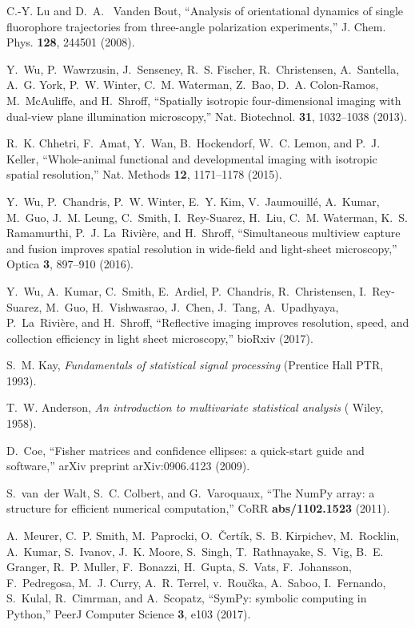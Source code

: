 \documentclass[10pt]{article}
\begin{document}
\begin{thebibliography}{10}
C.-Y. Lu and D.~A.~\hypertarget{vanden}{{\color{urlblue} Vanden}} Bout, \enquote{Analysis of orientational dynamics of
  single fluorophore trajectories from three-angle polarization experiments,}
  J. Chem. Phys. \textbf{128}, 244501 (2008).

Y.~Wu, P.~Wawrzusin, J.~Senseney, R.~S. Fischer, R.~Christensen, A.~Santella,
  A.~G. York, P.~W. Winter, C.~M. Waterman, Z.~Bao, D.~A. Colon-Ramos,
  M.~McAuliffe, and H.~Shroff, \enquote{Spatially isotropic four-dimensional
  imaging with dual-view plane illumination microscopy,} Nat. Biotechnol.
  \textbf{31}, 1032--1038 (2013).

R.~K. Chhetri, F.~Amat, Y.~Wan, B.~Hockendorf, W.~C. Lemon, and P.~J. Keller,
  \enquote{Whole-animal functional and developmental imaging with isotropic
  spatial resolution,} Nat. Methods \textbf{12}, 1171--1178 (2015).

Y.~Wu, P.~Chandris, P.~W. Winter, E.~Y. Kim, V.~Jaumouill{\'e}, A.~Kumar,
  M.~Guo, J.~M. Leung, C.~Smith, I.~Rey-Suarez, H.~Liu, C.~M. Waterman, K.~S.
  Ramamurthi, P.~J. La~Rivi\`ere, and H.~Shroff, \enquote{Simultaneous
  multiview capture and fusion improves spatial resolution in wide-field and
  light-sheet microscopy,} Optica \textbf{3}, 897--910 (2016).

Y.~Wu, A.~Kumar, C.~Smith, E.~Ardiel, P.~Chandris, R.~Christensen,
  I.~Rey-Suarez, M.~Guo, H.~Vishwasrao, J.~Chen, J.~Tang, A.~Upadhyaya,
  P.~La~Rivi\`ere, and H.~Shroff, \enquote{Reflective imaging improves
  resolution, speed, and collection efficiency in light sheet microscopy,}
  bioRxiv  (2017).

S.~M. Kay, \emph{Fundamentals of statistical signal processing} (Prentice Hall
  PTR, 1993).

  T.~W. Anderson, \emph{An introduction to multivariate statistical analysis}
(\hypertarget{wiley}{{\color{urlblue}
Wiley}}, 1958).

D.~Coe, \enquote{Fisher matrices and confidence ellipses: a quick-start guide
  and software,} arXiv preprint arXiv:0906.4123  (2009).

S.~van~der Walt, S.~C. Colbert, and G.~Varoquaux, \enquote{The {N}um{P}y array:
  a structure for efficient numerical computation,} CoRR \textbf{abs/1102.1523}
  (2011).

A.~Meurer, C.~P. Smith, M.~Paprocki, O.~\v{C}ert\'{i}k, S.~B. Kirpichev,
  M.~Rocklin, A.~Kumar, S.~Ivanov, J.~K. Moore, S.~Singh, T.~Rathnayake,
  S.~Vig, B.~E. Granger, R.~P. Muller, F.~Bonazzi, H.~Gupta, S.~Vats,
  F.~Johansson, F.~Pedregosa, M.~J. Curry, A.~R. Terrel, v.~Rou\v{c}ka,
  A.~Saboo, I.~Fernando, S.~Kulal, R.~Cimrman, and A.~Scopatz,
  \enquote{Sym{P}y: symbolic computing in {P}ython,} PeerJ Computer Science
  \textbf{3}, e103 (2017).


\end{thebibliography}
\end{document}
